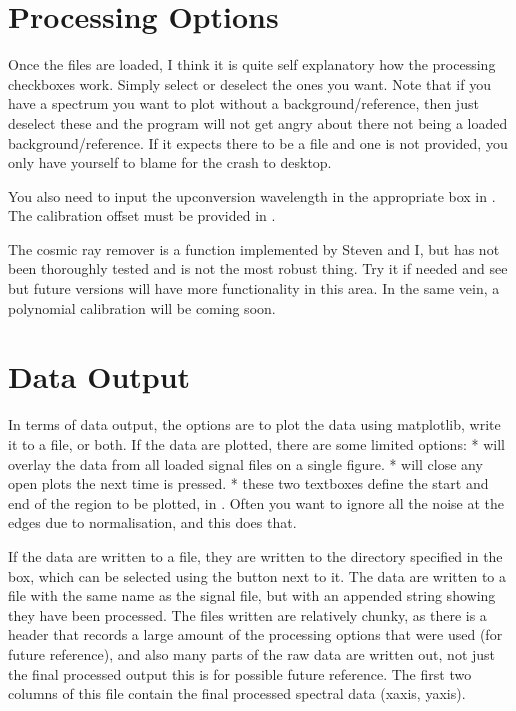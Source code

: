 \documentclass[a4paper,10pt,english]{sphinxmanual}
\begin{document}
\section{Processing Options}
\label{\detokenize{index:processing-options}}
\sphinxAtStartPar
Once the files are loaded, I think it is quite self explanatory how the processing checkboxes work. Simply select or deselect the ones you want. Note that if you have a spectrum you want to plot without a background/reference, then just deselect these and the program will not get angry about there not being a loaded background/reference. If it expects there to be a file and one is not provided, you only have yourself to blame for the crash to desktop.

\sphinxAtStartPar
You also need to input the upconversion wavelength in the appropriate box \sphinxhyphen{} in . The calibration offset must be provided in .

\sphinxAtStartPar
The cosmic ray remover is a function implemented by Steven and I, but has not been thoroughly tested and is not the most robust thing. Try it if needed and see \sphinxhyphen{} but future versions will have more functionality in this area. In the same vein, a polynomial calibration will be coming soon.


\section{Data Output}
\label{\detokenize{index:data-output}}
\sphinxAtStartPar
In terms of data output, the options are to plot the data using matplotlib, write it to a  file, or both. If the data are plotted, there are some limited options:
*  \sphinxhyphen{} will overlay the data from all loaded signal files on a single figure.
*  \sphinxhyphen{} will close any open plots the next time  is pressed.
*  \sphinxhyphen{} these two textboxes define the start and end of the region to be plotted, in . Often you want to ignore all the noise at the edges due to normalisation, and this does that.

\sphinxAtStartPar
If the data are written to a  file, they are written to the directory specified in the  box, which can be selected using the  button next to it. The data are written to a file with the same name as the signal file, but with an appended string showing they have been processed. The files written are relatively chunky, as there is a header that records a large amount of the processing options that were used (for future reference), and also many parts of the raw data are written out, not just the final processed output \sphinxhyphen{} this is for possible future reference. The first two columns of this file contain the final processed spectral data (xaxis, yaxis).
\end{document}
